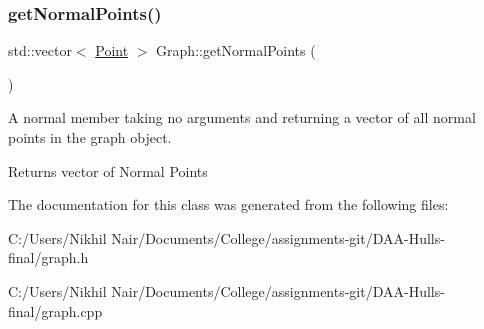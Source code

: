 \subsubsection{\texorpdfstring{getNormalPoints()}{getNormalPoints()}}
{\footnotesize\ttfamily std\+::vector$<$ \mbox{\hyperlink{struct_point}{Point}} $>$ Graph\+::get\+Normal\+Points (\begin{DoxyParamCaption}{ }\end{DoxyParamCaption})}



A normal member taking no arguments and returning a vector of all normal points in the graph object. 

\begin{DoxyReturn}{Returns}
vector of Normal Points 
\end{DoxyReturn}


The documentation for this class was generated from the following files\+:\begin{DoxyCompactItemize}
\item 
C\+:/\+Users/\+Nikhil Nair/\+Documents/\+College/assignments-\/git/\+D\+A\+A-\/\+Hulls-\/final/graph.\+h\item 
C\+:/\+Users/\+Nikhil Nair/\+Documents/\+College/assignments-\/git/\+D\+A\+A-\/\+Hulls-\/final/graph.\+cpp\end{DoxyCompactItemize}

